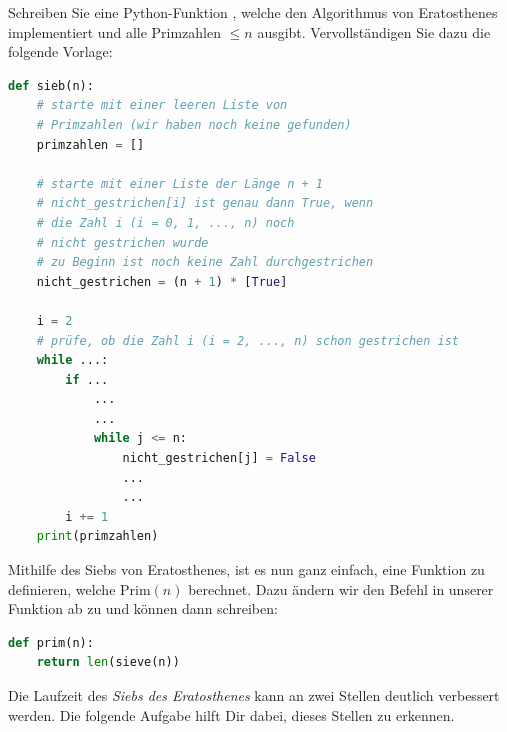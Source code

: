 \begin{myexercise}\label{myexercise:sieb}
	Schreiben Sie eine Python-Funktion , welche den Algorithmus von Eratosthenes implementiert und alle Primzahlen $\leq n$ ausgibt. Vervollständigen Sie dazu die folgende Vorlage:
	\begin{lstlisting}[language=Python,caption=Sieb des Eratosthenes,numbers=none]
def sieb(n):
    # starte mit einer leeren Liste von
    # Primzahlen (wir haben noch keine gefunden)
    primzahlen = []

    # starte mit einer Liste der Länge n + 1
    # nicht_gestrichen[i] ist genau dann True, wenn
    # die Zahl i (i = 0, 1, ..., n) noch
    # nicht gestrichen wurde
    # zu Beginn ist noch keine Zahl durchgestrichen
    nicht_gestrichen = (n + 1) * [True]

    i = 2
    # prüfe, ob die Zahl i (i = 2, ..., n) schon gestrichen ist
    while ...:
        if ...
            ...
            ...
            while j <= n:
                nicht_gestrichen[j] = False
                ...
                ...
        i += 1
    print(primzahlen)
\end{lstlisting}
	\begin{myanswer}
		
	\end{myanswer}
\end{myexercise}

Mithilfe des Siebs von Eratosthenes, ist es nun ganz einfach, eine Funktion zu definieren, welche $\text{Prim}(n)$ berechnet. Dazu ändern wir den Befehl  in unserer Funktion  ab zu  und können dann schreiben:
\begin{lstlisting}[language=Python,caption=Prim,numbers=none]
def prim(n):
    return len(sieve(n))
\end{lstlisting}
Die Laufzeit des \textit{Siebs des Eratosthenes} kann an zwei Stellen deutlich verbessert werden. Die folgende Aufgabe hilft Dir dabei, dieses Stellen zu erkennen.

